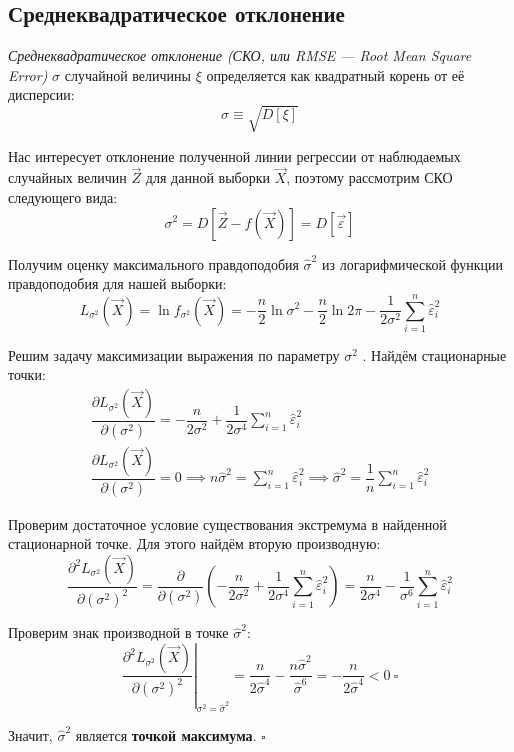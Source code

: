 \subsection{Среднеквадратическое отклонение}

\textit{Среднеквадратическое отклонение (СКО, или RMSE --- Root Mean Square Error)} \( \sigma \) случайной величины \( \xi \) определяется как квадратный корень от её дисперсии:
\[
    \sigma \equiv \sqrt{D[\xi]}
\]

Нас интересует отклонение полученной линии регрессии от наблюдаемых случайных величин \( \vec{Z} \) для данной выборки \( \vec{X} \), поэтому рассмотрим СКО следующего вида:
\[
    \sigma^2=D[\vec{Z}-f(\vec{X})]=D[\vec{\varepsilon}]
\]

Получим оценку максимального правдоподобия \( \hat{\sigma}^2 \) из логарифмической функции правдоподобия для нашей выборки:
\[
    L_{\sigma^2}(\vec{X})=\ln f_{\sigma^2}(\vec{X})=-\dfrac{n}{2}\ln\sigma^2-\dfrac{n}{2}\ln 2\pi-\dfrac{1}{2\sigma^2}\sum_{i=1}^n\hat{\varepsilon}^2_i
\]

Решим задачу максимизации выражения по параметру \( \sigma^2 \) . Найдём стационарные точки:
\[
    \begin{gathered}
    \dfrac{\partial L_{\sigma^2}(\vec{X})}{\partial(\sigma^2)}=-\dfrac{n}{2\sigma^2}+\dfrac{1}{2\sigma^4}\sum_{i=1}^n\hat{\varepsilon}_i^2\\
    \dfrac{\partial L_{\sigma^2}(\vec{X})}{\partial(\sigma^2)}=0\implies n\hat{\sigma}^2=\sum_{i=1}^n\hat{\varepsilon}^2_i\implies\hat{\sigma}^2=\dfrac{1}{n}\sum_{i=1}^n\hat{\varepsilon}^2_i
    \end{gathered}
\]

Проверим достаточное условие существования экстремума в найденной
стационарной точке. Для этого найдём вторую производную:
\[
    \dfrac{\partial^2 L_{\sigma^2}(\vec{X})}{\partial(\sigma^2)^2}=\dfrac{\partial}{\partial(\sigma^2)}\left(-\dfrac{n}{2\sigma^2}+\dfrac{1}{2\sigma^4}\sum_{i=1}^n\hat{\varepsilon}_i^2\right)=\dfrac{n}{2\sigma^4}-\dfrac{1}{\sigma^6}\sum_{i=1}^n\hat{\varepsilon}_i^2
\]

Проверим знак производной в точке \( \hat{\sigma}^2 \):
\[
    \left.\dfrac{\partial^2 L_{\sigma^2}(\vec{X})}{\partial(\sigma^2)^2}\right|_{\sigma^2=\hat{\sigma}^2}=\dfrac{n}{2\hat{\sigma}^4}-\dfrac{n\hat{\sigma}^2}{\hat{\sigma}^6}=-\dfrac{n}{2\hat{\sigma}^4}<0\ \square
\]

Значит, \( \hat{\sigma}^2 \) является \textbf{точкой максимума}. \( \square \)